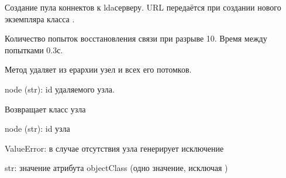 \documentclass[a4paper,10pt,russian]{sphinxmanual}
\begin{document}
\begin{fulllineitems}
\begin{fulllineitems}
\end{fulllineitems}



\begin{fulllineitems}

\pysigstartsignatures
{}
\pysigstopsignatures
\sphinxAtStartPar
Создание пула коннектов к lda\sphinxhyphen{}серверу.
URL передаётся при создании нового экземпляра класса .

\sphinxAtStartPar
Количество попыток восстановления связи при разрыве \sphinxhyphen{} 10. Время
между попытками \sphinxhyphen{} 0.3с.

\end{fulllineitems}



\begin{fulllineitems}

\pysigstartsignatures
{}
\pysigstopsignatures
\sphinxAtStartPar
Метод удаляет из ерархии узел и всех его потомков.
\begin{description}
\sphinxAtStartPar
node (str): id удаляемого узла.

\end{description}

\end{fulllineitems}



\begin{fulllineitems}

\pysigstartsignatures
{}
\pysigstopsignatures
\sphinxAtStartPar
Возвращает класс узла
\begin{description}
\sphinxAtStartPar
node (str): id узла

\sphinxAtStartPar
ValueError: в случае отсутствия узла генерирует исключение

\sphinxAtStartPar
str: значение атрибута objectClass (одно значение, исключая )


\end{description}
\end{fulllineitems}
\end{fulllineitems}
\end{document}

